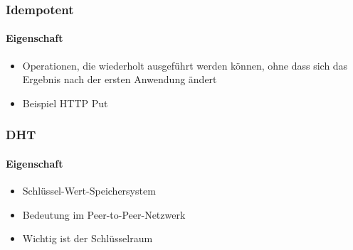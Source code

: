 \begin{frame}
  \frametitle{Idempotent}
  \framesubtitle{Eigenschaft}
  \begin{itemize}
    \item Operationen, die wiederholt ausgeführt werden können, ohne dass sich das Ergebnis nach der ersten Anwendung ändert
    \item Beispiel HTTP Put
  \end{itemize}
\end{frame}

\begin{frame}
  \frametitle{DHT}
  \framesubtitle{Eigenschaft}
  \begin{itemize}
    \item Schlüssel-Wert-Speichersystem
    \item Bedeutung im Peer-to-Peer-Netzwerk
    \item Wichtig ist der Schlüsselraum
  \end{itemize}
\end{frame}